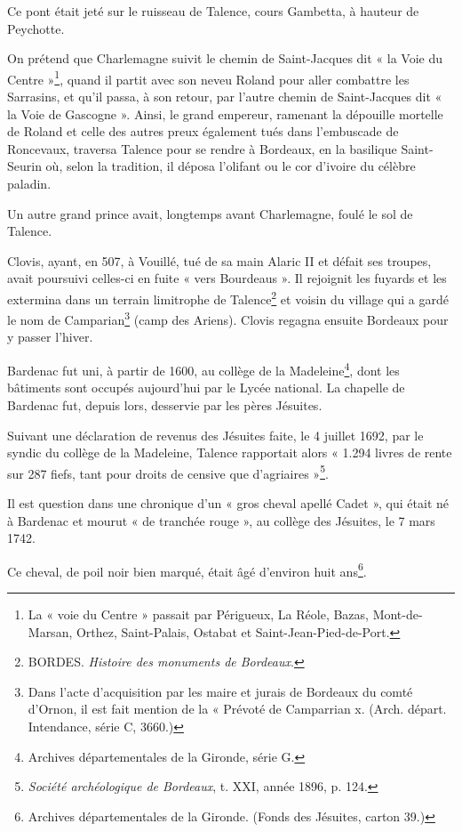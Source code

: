 \documentclass[a4paper,11pt]{book}
\begin{document}
Ce pont était jeté sur le ruisseau de Talence, cours Gambetta, à hauteur de Peychotte.

On prétend que Charlemagne suivit le chemin de Saint-Jacques dit « la Voie du Centre »\footnote{La « voie du Centre » passait par Périgueux, La Réole, Bazas, Mont-de-Marsan, Orthez, Saint-Palais, Ostabat et Saint-Jean-Pied-de-Port.}, quand il partit avec son neveu Roland pour aller combattre les Sarrasins, et qu'il passa, à son retour, par l'autre chemin de Saint-Jacques dit « la Voie de Gascogne ». Ainsi, le grand empereur, ramenant la dépouille mortelle de Roland et celle des autres preux également tués dans l'embuscade de Roncevaux, traversa Talence pour se rendre à Bordeaux, en la basilique Saint-Seurin où, selon la tradition, il déposa l'olifant ou le cor d'ivoire du célèbre paladin.

Un autre grand prince avait, longtemps avant Charlemagne, foulé le sol de Talence.

Clovis, ayant, en 507, à Vouillé, tué de sa main Alaric II et défait ses troupes, avait poursuivi celles-ci en fuite « vers Bourdeaus ». Il rejoignit les fuyards et les extermina dans un terrain limitrophe de Talence\footnote{BORDES. \textit{Histoire des monuments de Bordeaux}.} et voisin du village qui a gardé le nom de Camparian\footnote{Dans l'acte d'acquisition par les maire et jurais de Bordeaux du comté d'Ornon, il est fait mention de la « Prévoté de Camparrian x. (Arch. départ. Intendance, série C, 3660.)} (camp des Ariens). Clovis regagna ensuite Bordeaux pour y passer l'hiver.

Bardenac fut uni, à partir de 1600, au collège de la Madeleine\footnote{Archives départementales de la Gironde, série G.}, dont les bâtiments sont occupés aujourd'hui par le Lycée national. La chapelle de Bardenac fut, depuis lors, desservie par les pères Jésuites.

Suivant une déclaration de revenus des Jésuites faite, le 4 juillet 1692, par le syndic du collège de la Madeleine, Talence rapportait alors « 1.294 livres de rente sur 287 fiefs, tant pour droits de censive que d'agriaires »\footnote{\textit{Société archéologique de Bordeaux}, t. XXI, année 1896, p. 124.}.

Il est question dans une chronique d'un « gros cheval apellé Cadet », qui était né à Bardenac et mourut « de tranchée rouge », au collège des Jésuites, le 7 mars 1742.

Ce cheval, de poil noir bien marqué, était âgé d'environ huit ans\footnote{Archives départementales de la Gironde. (Fonds des Jésuites, carton 39.)}.
\end{document}
